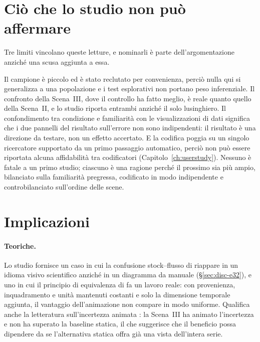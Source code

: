 \section{Ciò che lo studio non può affermare}
\label{sec:disc-limits}

Tre limiti vincolano queste letture, e nominarli è parte dell'argomentazione anziché una scusa aggiunta a essa.

Il campione è piccolo ed è stato reclutato per convenienza, perciò nulla qui si generalizza a una popolazione e i test esplorativi non portano peso inferenziale. Il confronto della Scena~III, dove il controllo ha fatto meglio, è reale quanto quello della Scena~II, e lo studio riporta entrambi anziché il solo lusinghiero. Il confondimento tra condizione e familiarità con le visualizzazioni di dati significa che i due pannelli del risultato sull'errore non sono indipendenti: il risultato è una direzione da testare, non un effetto accertato. E la codifica poggia su un singolo ricercatore supportato da un primo passaggio automatico, perciò non può essere riportata alcuna affidabilità tra codificatori (Capitolo~\ref{ch:userstudy}). Nessuno è fatale a un primo studio; ciascuno è una ragione perché il prossimo sia più ampio, bilanciato sulla familiarità pregressa, codificato in modo indipendente e controbilanciato sull'ordine delle scene.

\section{Implicazioni}
\label{sec:disc-implications}

\paragraph{Teoriche.} Lo studio fornisce un caso in cui la confusione stock--flusso di \textcite{sterman2008} riappare in un idioma visivo scientifico anziché in un diagramma da manuale (\S\ref{sec:disc-e32}), e uno in cui il principio di equivalenza di \textcite{tversky2002} fa un lavoro reale: con provenienza, inquadramento e unità mantenuti costanti e solo la dimensione temporale aggiunta, il vantaggio dell'animazione non compare in modo uniforme. Qualifica anche la letteratura sull'incertezza animata \parencite{hullman2015hops, kale2019hops}: la Scena~III ha animato l'incertezza e non ha superato la baseline statica, il che suggerisce che il beneficio possa dipendere da se l'alternativa statica offra già una vista dell'intera serie.

